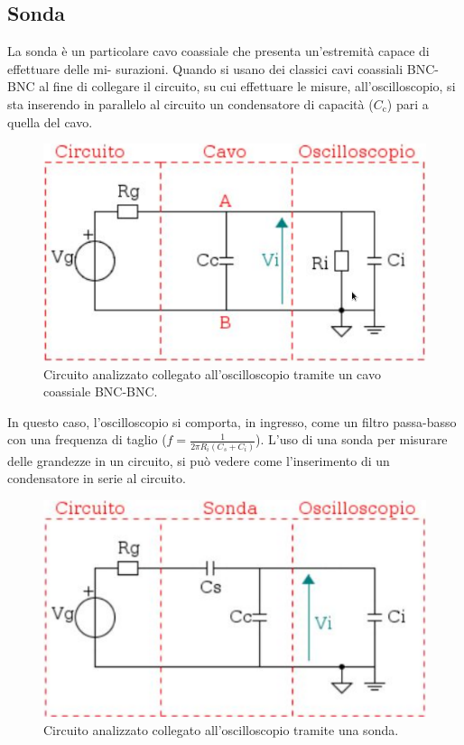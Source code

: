 \documentclass{article}
\begin{document}
		\subsection{Sonda}
			La sonda è un particolare cavo coassiale che presenta un'estremità capace di effettuare delle mi-
			\newline
			surazioni.
			\newline
			Quando si usano dei classici cavi coassiali BNC-BNC al fine di collegare il circuito, su cui effettuare le misure, all'oscilloscopio, si sta inserendo in parallelo al circuito un condensatore di capacità ($ C_{\mathrm{c}} $) pari a quella del cavo.
			\begin{figure}[h!]
				\centering
				\includegraphics[scale=0.4]{theveninCavoDSO}
				\caption{Circuito analizzato collegato all'oscilloscopio tramite un cavo coassiale BNC-BNC.}
				\label{fig:theveninCavoDSO}
			\end{figure}
			\newpage
			In questo caso, l’oscilloscopio si comporta, in ingresso, come un filtro passa-basso con una frequenza di taglio ($ f = \frac{1}{2\pi R_{i} (C_{s} + C_{i})} $). L'uso di una sonda per misurare delle grandezze in un circuito, si può vedere come l'inserimento di un condensatore in serie al circuito.
			\begin{figure}[h!]
				\centering
				\includegraphics[scale=0.4]{theveninSondaDSOCircuito}
				\caption{Circuito analizzato collegato all'oscilloscopio tramite una sonda.}
				\label{fig:theveninSondaDSOCircuito}
			\end{figure}
\end{document}
